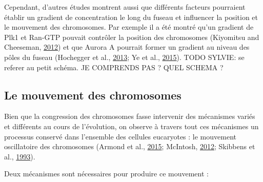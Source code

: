 \documentclass[12pt,a4paper,twoside,openright]{book}
\begin{document}
Cependant, d'autres études montrent aussi que différents facteurs
pourraient établir un gradient de concentration le long du fuseau et
influencer la position et le mouvement des chromosomes. Par exemple il a
été montré qu'un gradient de Plk1 et Ran-GTP pouvait contrôler la
position des chromosomes (Kiyomitsu and Cheeseman,
\hyperref[ref-Kiyomitsu2012]{2012}) et que Aurora A pourrait former un
gradient au niveau des pôles du fuseau (Hochegger et al.,
\hyperref[ref-Hochegger2013]{2013}; Ye et al.,
\hyperref[ref-Ye2015]{2015}). TODO SYLVIE: se referer au petit schéma.
JE COMPRENDS PAS ? QUEL SCHEMA ?

\subsection{Le mouvement des
chromosomes}\label{le-mouvement-des-chromosomes}

Bien que la congression des chromosomes fasse intervenir des mécanismes
variés et différents au cours de l'évolution, on observe à travers tout
ces mécanismes un processus conservé dans l'ensemble des cellules
eucaryotes : le mouvement oscillatoire des chromosomes (Armond et al.,
\hyperref[ref-Armond2015]{2015}; McIntosh,
\hyperref[ref-McIntosh2012]{2012}; Skibbens et al.,
\hyperref[ref-Skibbens1993]{1993}).

Deux mécanismes sont nécessaires pour produire ce mouvement :
\end{document}
